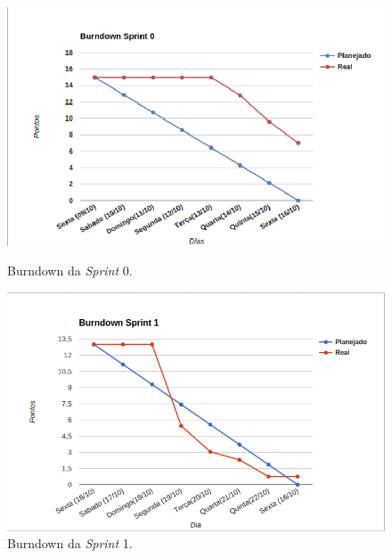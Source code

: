 	\begin{figure}[!h]
	\begin{minipage}[b]{0.5\linewidth}
	\centering
	\includegraphics[scale=0.5]{figuras/burndown_sprint0.png}
	\caption{Burndown da \textit{Sprint} 0.}
	\label{fig:burndown0}
	\end{minipage}
	\hspace{0.5cm}
	\begin{minipage}[b]{0.5\linewidth}
	\centering
	\includegraphics[scale=0.5]{figuras/burndown_sprint1.png}
	\caption{Burndown da \textit{Sprint} 1.}
	\label{fig:burndown1}
	\end{minipage}
	\end{figure}

